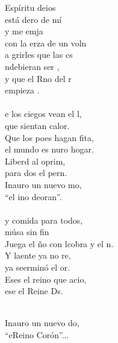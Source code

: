 \begin{cancion}%
	 Espíritu deios\\
	está dero de mí\\
	y me emja\\
	con la erza de un voln\\
	a grirles que las cs\\
	ndebieran ser , \\
	y que el Rno del r\\
	empieza .\\
\jump\\
	e los ciegos vean el l,\\
	que sientan  calor.\\
	Que los poes hagan fita,\\
	el mundo es nuro hogar.\\
	Liberd al oprim,\\
	para dos el pern.\\
	Inauro un nuevo mo,\\
	“el ino deoran”. \\
\jump\\
	y comida para todos,\\
	músa sin fin\\
	Juega el ño con lcobra y el n. \\
	Y laente ya no re,\\
	ya seerminó el or.\\
	Eses el reino que acio,\\
	ese  el Reine Ds.\\\jump\\
	\begin{chorus}%
	Inauro un nuevo do,\\
	“eReino  Corón”...\\
	\end{chorus}%
	\jump\\
\end{cancion}%
